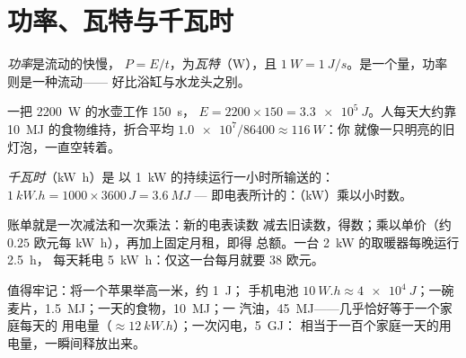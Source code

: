 \section{功率、瓦特与千瓦时}

\begin{definition}[功率]\label{def:g10:energy-conservation:power}
\emph{功率}是流动的快慢，
$P = E/t$，为\emph{瓦特}（\unit{W}），且
$\qty{1}{W} = \qty{1}{J/s}$。是一个量，功率则是一种流动——
好比浴缸与水龙头之别。
\end{definition}

\begin{example}[水壶与人]\label{ex:g10:energy-conservation:power}
一把 \qty{2200}{W} 的水壶工作 \qty{150}{s}，
$E = 2200 \times 150 = \qty{3.3e5}{J}$。人每天大约靠
\qty{10}{MJ} 的食物维持，折合平均
 $\num{1.0e7}/\num{86400} \approx \qty{116}{W}$：你
就像一只明亮的旧灯泡，一直空转着。
\end{example}

\begin{definition}[千瓦时]\label{def:g10:energy-conservation:kwh}
\emph{千瓦时}（\unit{kW.h}）是
以 \qty{1}{kW} 的持续运行一小时所输送的：
$\qty{1}{kW.h} = 1000 \times 3600\,\unit{J} = \qty{3.6}{MJ}$ ---
即电表所计的：（\unit{kW}）乘以小时数。
\end{definition}

\begin{example}[读懂电费账单]\label{ex:g10:energy-conservation:bill}
账单就是一次减法和一次乘法：新的电表读数
减去旧读数，得数；乘以单价（约
$0.25$ 欧元每 \unit{kW.h}），再加上固定月租，即得
总额。一台 \qty{2}{kW} 的取暖器每晚运行 \qty{2.5}{h}，
每天耗电 \qty{5}{kW.h}：仅这一台每月就要 $38$ 欧元。
\end{example}

\begin{example}[数量级]\label{ex:g10:energy-conservation:orders}
值得牢记：将一个苹果举高一米，约 \qty{1}{J}；
手机电池 $\qty{10}{W.h} \approx \qty{4e4}{J}$；一碗
麦片，\qty{1.5}{MJ}；一天的食物，\qty{10}{MJ}；一
汽油，\qty{45}{MJ}——几乎恰好等于一个家庭每天的
用电量（$\approx \qty{12}{kW.h}$）；一次闪电，\qty{5}{GJ}：
相当于一百个家庭一天的用电量，一瞬间释放出来。
\end{example}


